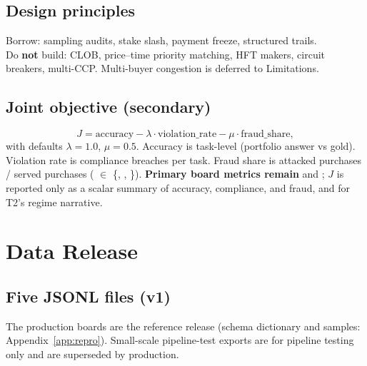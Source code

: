 \documentclass[sigconf,review]{acmart}
\begin{document}
\subsection{Design principles}
\label{sec:principles}

Borrow: sampling audits, stake slash, payment freeze, structured trails.\\
Do \textbf{not} build: CLOB, price--time priority matching, HFT makers, circuit breakers, multi-CCP. Multi-buyer congestion is deferred to Limitations.

\subsection{Joint objective (secondary)}
\label{sec:joint}

\begin{equation}
J = \mathrm{accuracy} - \lambda \cdot \mathrm{violation\_rate} - \mu \cdot \mathrm{fraud\_share},
\end{equation}
with defaults $\lambda=1.0$, $\mu=0.5$. Accuracy is task-level (portfolio answer vs gold). Violation rate is compliance breaches per task. Fraud share is attacked purchases / served purchases ( $\in$ \{, , \}).
\textbf{Primary board metrics remain}  and ; $J$ is reported only as a scalar summary of accuracy, compliance, and fraud, and for T2's regime narrative.

\section{Data Release}
\label{sec:data}

\subsection{Five JSONL files (v1)}
\label{sec:files}

The production boards are the reference release (schema dictionary and samples: Appendix~\ref{app:repro}). Small-scale pipeline-test exports are for pipeline testing only and are superseded by production.
\end{document}
